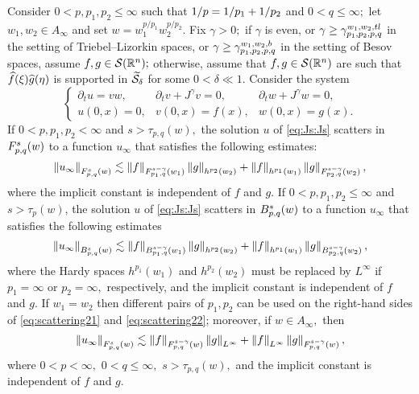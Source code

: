 \begin{theorem}\label{thm:scattering2} Consider  $0 < p, p_1, p_2  \le \infty$  such that $\hcline$ and  $0 < q \leq \infty;$ let  $w_1,w_2\in A_\infty$ and set $w=w_1^{{p}/{p_1}} w_2^{{p}/{p_2}}.$ Fix $\gamma>0;$ if $\gamma$ is even, or $\gamma\ge \gamt$ in the setting of Triebel--Lizorkin spaces, or $\gamma\ge \gamb$ in the setting of Besov spaces, assume $f, g \in \sw;$ otherwise, assume that $f,g\in\sw$ are such that $\fhat(\xi)\ghat(\eta)$ is supported in $\widetilde{\Ss}_{\delta}$ for some $0<\delta\ll1.$ Consider the system 
\begin{equation}\label{eq:Js:Js}
\left\{ \begin{array}{lll}  \partial_t u =vw, & \partial_t v +J^\gamma v = 0, & \partial_t w + J^\gamma w = 0, \\
  u(0,x)=0,&v(0,x)=f(x),&w(0,x) = g(x).
 \end{array} \right.
\end{equation}
If $0 < p,p_1,p_2 < \infty$ and  $s > \tau_{p,q}(w),$ the solution $u$ of \eqref{eq:Js:Js}  scatters in $\itlw{p}{s}{q}{w}$ to a function $u_\infty$ that satisfies the following estimates: 
\begin{equation}\label{eq:scattering21}
\norm{u_\infty}{\itlw{p}{s}{q}{w}} \lesssim \norm{f}{\itlw{p_1}{s-\gamma}{q}{w_1} } \norm{g}{h^{p_2}(w_2)} +  \norm{f}{h^{p_1}(w_1)}   \norm{g}{\itlw{p_2}{s-\gamma}{q}{w_2} },
\end{equation}
where the implicit constant is independent of $f$ and $g.$  
If $0< p, p_1,p_2\leq \infty$ and $s > \tau_p(w)$, the solution $u$ of \eqref{eq:Js:Js}  scatters in $\ibesw{p}{s}{q}{w}$ to a function $u_\infty$ that satisfies the following estimates
\begin{equation}\label{eq:scattering22}
\norm{u_\infty}{\ibesw{p}{s}{q}{w}} \lesssim \norm{f}{\ibesw{p_1}{s-\gamma}{q}{w_1} } \norm{g}{h^{p_2}(w_2)} +  \norm{f}{h^{p_1}(w_1)}   \norm{g}{\ibesw{p_2}{s-\gamma}{q}{w_2} },
\end{equation}
where the Hardy spaces $h^{p_1}(w_1)$ and $h^{p_2}(w_2)$ must be replaced by $L^\infty$ if $p_1=\infty$ or $p_2=\infty,$ respectively, and the implicit constant is independent of $f$ and $g.$  
If $w_1=w_2$ then different pairs of $p_1, p_2$ can be used on the right-hand sides of \eqref{eq:scattering21} and \eqref{eq:scattering22}; moreover, if $w\in A_\infty,$ then 
\begin{equation*}
\norm{u_\infty}{\itlw{p}{s}{q}{w}} \lesssim \norm{f}{\itlw{p}{s-\gamma}{q}{w} } \norm{g}{L^\infty} +  \norm{f}{L^\infty}   \norm{g}{\itlw{p}{s-\gamma}{q}{w}},
\end{equation*}
where $0<p<\infty,$ $0<q\le\infty,$  $s>\tau_{p,q}(w),$ and the implicit constant is independent of $f$ and $g.$  
\end{theorem}  
 

